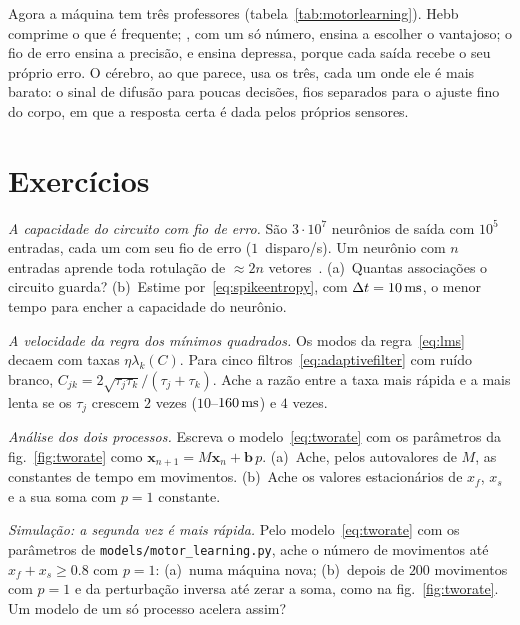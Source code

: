 Agora a máquina tem três professores (tabela~\ref{tab:motorlearning}). Hebb comprime o que é frequente; , com um só número, ensina a escolher o vantajoso; o fio de erro ensina a precisão, e ensina depressa, porque cada saída recebe o seu próprio erro. O cérebro, ao que parece, usa os três, cada um onde ele é mais barato: o sinal de difusão para poucas decisões, fios separados para o ajuste fino do corpo, em que a resposta certa é dada pelos próprios sensores.

\section{Exercícios}

\begin{exercise}[\lvlA]
\label{ex:15:1}
\emph{A capacidade do circuito com fio de erro.} São $3\cdot10^7$ neurônios de saída com $10^5$ entradas, cada um com seu fio de erro ($1$~disparo/s). Um neurônio com $n$ entradas aprende toda rotulação de $\approx2n$ vetores~\cite{Cover1965}. (a)~Quantas associações o circuito guarda? (b)~Estime por~\eqref{eq:spikeentropy}, com $\Delta t=10\,\text{ms}$, o menor tempo para encher a capacidade do neurônio.
\end{exercise}

\begin{exercise}[\lvlB]
\label{ex:15:2}
\emph{A velocidade da regra dos mínimos quadrados.} Os modos da regra~\eqref{eq:lms} decaem com taxas $\eta\lambda_k(C)$. Para cinco filtros~\eqref{eq:adaptivefilter} com ruído branco, $C_{jk}=2\sqrt{\tau_j\tau_k}/(\tau_j+\tau_k)$. Ache a razão entre a taxa mais rápida e a mais lenta se os $\tau_j$ crescem $2$ vezes ($10$--$160\,\text{ms}$) e $4$ vezes.
\end{exercise}

\begin{exercise}[\lvlB]
\label{ex:15:3}
\emph{Análise dos dois processos.} Escreva o modelo~\eqref{eq:tworate} com os parâmetros da fig.~\ref{fig:tworate} como $\mathbf x_{n+1}=M\mathbf x_n+\mathbf b\,p$. (a)~Ache, pelos autovalores de $M$, as constantes de tempo em movimentos. (b)~Ache os valores estacionários de $x_f$, $x_s$ e a sua soma com $p=1$ constante.
\end{exercise}

\begin{exercise}[\lvlB]
\label{ex:15:4}
\emph{Simulação: a segunda vez é mais rápida.} Pelo modelo~\eqref{eq:tworate} com os parâmetros de \texttt{models/\allowbreak motor\_learning.py}, ache o número de movimentos até $x_f+x_s\ge0.8$ com $p=1$: (a)~numa máquina nova; (b)~depois de $200$ movimentos com $p=1$ e da perturbação inversa até zerar a soma, como na fig.~\ref{fig:tworate}. Um modelo de um só processo acelera assim?
\end{exercise}

